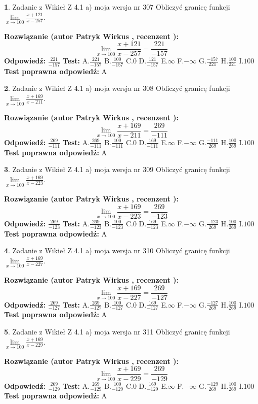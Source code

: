 \documentclass[12pt, a4paper]{article}
\theoremstyle{definition} %
\newtheorem{zad}{}
\newcommand{\zadStart}[1]{\begin{zad}#1\newline}
\newcommand{\zadStop}{\end{zad}}
\newcommand{\rozwStart}[2]{\noindent \textbf{Rozwiązanie (autor #1 , recenzent #2): }\newline}
\newcommand{\rozwStop}{\newline}
\newcommand{\odpStart}{\noindent \textbf{Odpowiedź:}\newline}
\newcommand{\odpStop}{\newline}
\newcommand{\testStart}{\noindent \textbf{Test:}\newline}
\newcommand{\testStop}{\newline}
\newcommand{\kluczStart}{\noindent \textbf{Test poprawna odpowiedź:}\newline}
\newcommand{\kluczStop}{\newline}
\begin{document}
\zadStart{Zadanie z Wikieł Z 4.1 a) moja wersja nr 307}
Obliczyć granicę funkcji $\lim\limits_{x\to100}\frac{x+121}{x-257}$.
\zadStop
\rozwStart{Patryk Wirkus}{}
$$\lim\limits_{x\to100}\frac{x+121}{x-257} = \frac{221}{-157}$$
\rozwStop
\odpStart
$\frac{221}{-157}$
\odpStop
\testStart
A.$\frac{221}{-157}$
B.$\frac{100}{-157}$
C.$0$
D.$\frac{121}{-157}$
E.$\infty$
F.$-\infty$
G.$\frac{-157}{221}$
H.$\frac{100}{221}$
I.$100$
\testStop
\kluczStart
A
\kluczStop



\zadStart{Zadanie z Wikieł Z 4.1 a) moja wersja nr 308}
Obliczyć granicę funkcji $\lim\limits_{x\to100}\frac{x+169}{x-211}$.
\zadStop
\rozwStart{Patryk Wirkus}{}
$$\lim\limits_{x\to100}\frac{x+169}{x-211} = \frac{269}{-111}$$
\rozwStop
\odpStart
$\frac{269}{-111}$
\odpStop
\testStart
A.$\frac{269}{-111}$
B.$\frac{100}{-111}$
C.$0$
D.$\frac{169}{-111}$
E.$\infty$
F.$-\infty$
G.$\frac{-111}{269}$
H.$\frac{100}{269}$
I.$100$
\testStop
\kluczStart
A
\kluczStop



\zadStart{Zadanie z Wikieł Z 4.1 a) moja wersja nr 309}
Obliczyć granicę funkcji $\lim\limits_{x\to100}\frac{x+169}{x-223}$.
\zadStop
\rozwStart{Patryk Wirkus}{}
$$\lim\limits_{x\to100}\frac{x+169}{x-223} = \frac{269}{-123}$$
\rozwStop
\odpStart
$\frac{269}{-123}$
\odpStop
\testStart
A.$\frac{269}{-123}$
B.$\frac{100}{-123}$
C.$0$
D.$\frac{169}{-123}$
E.$\infty$
F.$-\infty$
G.$\frac{-123}{269}$
H.$\frac{100}{269}$
I.$100$
\testStop
\kluczStart
A
\kluczStop



\zadStart{Zadanie z Wikieł Z 4.1 a) moja wersja nr 310}
Obliczyć granicę funkcji $\lim\limits_{x\to100}\frac{x+169}{x-227}$.
\zadStop
\rozwStart{Patryk Wirkus}{}
$$\lim\limits_{x\to100}\frac{x+169}{x-227} = \frac{269}{-127}$$
\rozwStop
\odpStart
$\frac{269}{-127}$
\odpStop
\testStart
A.$\frac{269}{-127}$
B.$\frac{100}{-127}$
C.$0$
D.$\frac{169}{-127}$
E.$\infty$
F.$-\infty$
G.$\frac{-127}{269}$
H.$\frac{100}{269}$
I.$100$
\testStop
\kluczStart
A
\kluczStop



\zadStart{Zadanie z Wikieł Z 4.1 a) moja wersja nr 311}
Obliczyć granicę funkcji $\lim\limits_{x\to100}\frac{x+169}{x-229}$.
\zadStop
\rozwStart{Patryk Wirkus}{}
$$\lim\limits_{x\to100}\frac{x+169}{x-229} = \frac{269}{-129}$$
\rozwStop
\odpStart
$\frac{269}{-129}$
\odpStop
\testStart
A.$\frac{269}{-129}$
B.$\frac{100}{-129}$
C.$0$
D.$\frac{169}{-129}$
E.$\infty$
F.$-\infty$
G.$\frac{-129}{269}$
H.$\frac{100}{269}$
I.$100$
\testStop
\kluczStart
A
\kluczStop
\end{document}
